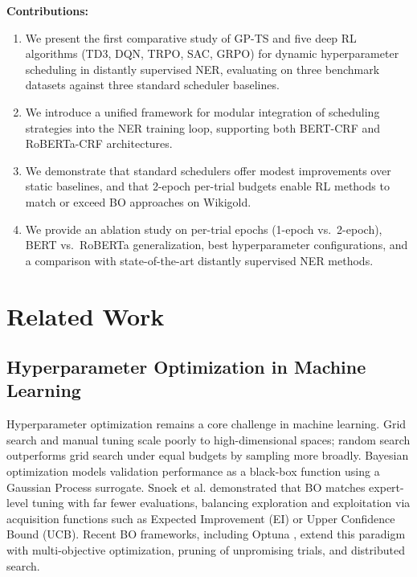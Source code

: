 \documentclass[11pt]{article}
\begin{document}
\textbf{Contributions:}
\begin{enumerate}
    \item We present the first comparative study of GP-TS and five deep RL algorithms (TD3, DQN, TRPO, SAC, GRPO) for dynamic hyperparameter scheduling in distantly supervised NER, evaluating on three benchmark datasets against three standard scheduler baselines.
    \item We introduce a unified framework for modular integration of scheduling strategies into the NER training loop, supporting both BERT-CRF and RoBERTa-CRF architectures.
    \item We demonstrate that standard schedulers offer modest improvements over static baselines, and that 2-epoch per-trial budgets enable RL methods to match or exceed BO approaches on Wikigold.
    \item We provide an ablation study on per-trial epochs (1-epoch vs.\ 2-epoch), BERT vs.\ RoBERTa generalization, best hyperparameter configurations, and a comparison with state-of-the-art distantly supervised NER methods.
\end{enumerate}

\section{Related Work}

\subsection{Hyperparameter Optimization in Machine Learning}

Hyperparameter optimization remains a core challenge in machine learning. Grid search and manual tuning scale poorly to high-dimensional spaces; random search \cite{bergstra2012random} outperforms grid search under equal budgets by sampling more broadly. Bayesian optimization models validation performance as a black-box function using a Gaussian Process surrogate. Snoek et al. \cite{snoek2012practical} demonstrated that BO matches expert-level tuning with far fewer evaluations, balancing exploration and exploitation via acquisition functions such as Expected Improvement (EI) or Upper Confidence Bound (UCB). Recent BO frameworks, including Optuna \cite{akiba2019optuna}, extend this paradigm with multi-objective optimization, pruning of unpromising trials, and distributed search.
\end{document}
